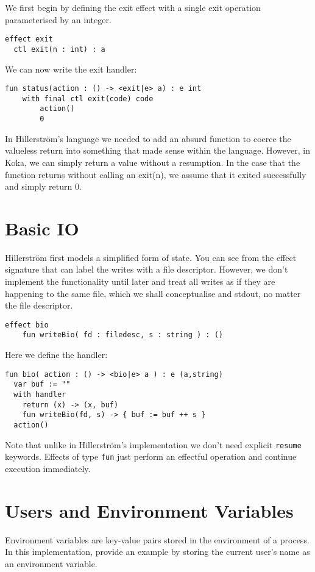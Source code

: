 \documentclass[logo,bsc,singlespacing,parskip]{infthesis}
\begin{document}
We first begin by defining the exit effect with a single exit operation parameterised by an integer.
\begin{lstlisting}
effect exit
  ctl exit(n : int) : a
\end{lstlisting}

We can now write the exit handler:
\begin{lstlisting}
fun status(action : () -> <exit|e> a) : e int
    with final ctl exit(code) code
        action()
        0
\end{lstlisting}
In Hillerström's language we needed to add an absurd function to coerce the valueless return into something that made sense within the language. However, in Koka, we can simply return a value without a resumption. In the case that the function returns without calling an exit(n), we assume that it exited successfully and simply return 0.

\section{Basic IO}
Hillerström first models a simplified form of state. You can see from the effect signature that can label the writes with a file descriptor. However, we don't implement the functionality until later and treat all writes as if they are happening to the same file, which we shall conceptualise and stdout, no matter the file descriptor.

\begin{lstlisting}
effect bio
    fun writeBio( fd : filedesc, s : string ) : ()
\end{lstlisting}

Here we define the handler:

\begin{lstlisting}
fun bio( action : () -> <bio|e> a ) : e (a,string)
  var buf := ""    
  with handler
    return (x) -> (x, buf)
    fun writeBio(fd, s) -> { buf := buf ++ s }
  action()
\end{lstlisting}

Note that unlike in Hillerström's implementation we don't need explicit \texttt{resume} keywords. Effects of type \texttt{fun} just perform an effectful operation and continue execution immediately. 

\section{Users and Environment Variables}
Environment variables are key-value pairs stored in the environment of a process. In this implementation, provide an example by storing the current user's name as an environment variable.
\end{document}

